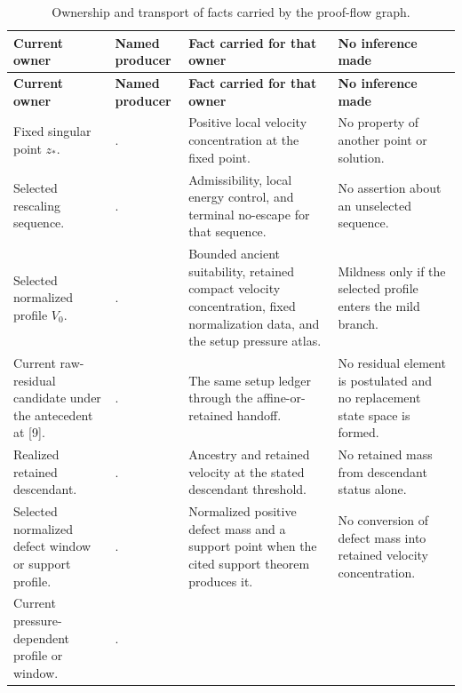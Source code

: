 \documentclass[11pt]{amsart}
\numberwithin{equation}{section}
\theoremstyle{plain}
\theoremstyle{definition}
\theoremstyle{remark}
\begin{document}
\begingroup
\scriptsize
\setlength{\tabcolsep}{2pt}
\renewcommand{\arraystretch}{1.16}
\begin{longtable}{@{}L{0.18\textwidth}L{0.25\textwidth}L{0.29\textwidth}L{0.20\textwidth}@{}}
\caption{Ownership and transport of facts carried by the proof-flow graph.}
\label{tab:typeI-proof-flow-monotone-ledger}\\
\hline
\textbf{Current owner} & \textbf{Named producer} &
\textbf{Fact carried for that owner} & \textbf{No inference made}\\
\hline
\endfirsthead
\hline
\textbf{Current owner} & \textbf{Named producer} &
\textbf{Fact carried for that owner} & \textbf{No inference made}\\
\hline
\endhead
\hline
\endfoot
Fixed singular point \(z_*\). &
. &
Positive local velocity concentration at the fixed point. &
No property of another point or solution.\\
Selected rescaling sequence. &
. &
Admissibility, local energy control, and terminal no-escape for that sequence. &
No assertion about an unselected sequence.\\
Selected normalized profile \(V_0\). &
. &
Bounded ancient suitability, retained compact velocity concentration, fixed
normalization data, and the setup pressure atlas. &
Mildness only if the selected profile enters the mild branch.\\
Current raw-residual candidate under the antecedent at [9]. &
. &
The same setup ledger through the affine-or-retained handoff. &
No residual element is postulated and no replacement state space is formed.\\
Realized retained descendant. &
. &
Ancestry and retained velocity at the stated descendant threshold. &
No retained mass from descendant status alone.\\
Selected normalized defect window or support profile. &
. &
Normalized positive defect mass and a support point when the cited support
theorem produces it. &
No conversion of defect mass into retained velocity concentration.\\
Current pressure-dependent profile or window. &
. &

\end{longtable}
\end{document}
